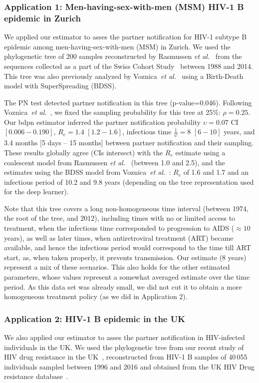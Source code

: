 \documentclass[10pt,letterpaper]{article}
\begin{document}
\subsubsection*{Application 1: Men-having-sex-with-men (MSM) HIV-1 B epidemic in Zurich}
We applied our estimator to asses the partner notification for HIV-1 subtype B epidemic among men-having-sex-with-men (MSM) in Zurich.  We used the phylogenetic tree of 200 samples reconstructed by Rasmussen \textit{et al.}~\cite{Rasmussen2017} from the sequences collected as a part of the Swiss Cohort Study~\cite{swisshivcohortstudyCohortProfileSwiss2010a} between 1988 and 2014. This tree was also previously analyzed by Voznica~\textit{et al.}~\cite{Voznica2021} using a Birth-Death model with SuperSpreading (BDSS). 

The PN test detected partner notification in this tree (p-value=0.046). Following Voznica~\textit{et al.}~\cite{Voznica2021}, we fixed the sampling probability for this tree at 25\%: $\rho=0.25$. Our bdpn estimator inferred the partner notification probability $\upsilon=0.07$ CI $[0.006-0.190]$,  
$R_e = 1.4$ $[1.2-1.6]$, infectious time $\frac{1}{\psi} = 8$ $[6-10]$ years, and 3.4 months [5 days -- 15 months] between partner notification and their sampling. These results globally agree (CIs intersect) with the $R_e$ estimate using a coalescent model from Rasmussen \textit{et al.}~\cite{Rasmussen2017} (between 1.0 and 2.5), and the estimates using the BDSS model from Voznica~\textit{et al.}~\cite{Voznica2021}: $R_e$ of 1.6 and 1.7 and an infectious period of 10.2 and 9.8 years (depending on the tree representation used for the deep learner).

Note that this tree covers a long non-homogeneous time interval (between 1974, the root of the tree, and 2012), including times with no or limited access to treatment, when the infectious time corresponded to progression to AIDS ($\approx 10$ years), as well as later times, when antiretroviral treatment (ART) became available, and hence the infectious period would correspond to the time till ART start, as, when taken properly, it prevents transmission. Our estimate (8 years) represent a mix of these scenarios. This also holds for the other estimated parameters, whose values represent a somewhat averaged estimate over the time period. As this data set was already small, we did not cut it to obtain a more homogeneous treatment policy (as we did in Application 2).


\subsubsection*{Application 2: HIV-1 B epidemic in the UK}
We also applied our estimator to asses the partner notification in HIV-infected individuals in the UK. We used the phylogenetic tree from our recent study of HIV drug resistance in the UK~\cite{zhukovaModelingDrugResistance2023}, reconstructed from HIV-1 B samples of 40\,055 individuals sampled between 1996 and 2016 and obtained from the UK HIV Drug resistance database~\cite{Dunn2007}. 
\end{document}
